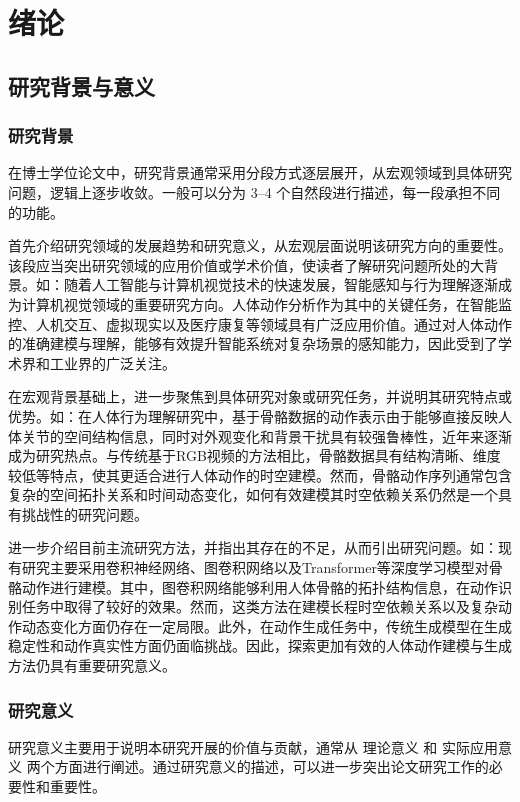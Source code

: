 
\chapter{绪论}
\section{研究背景与意义}
\subsection{研究背景}

在博士学位论文中，研究背景通常采用分段方式逐层展开，从宏观领域到具体研究问题，逻辑上逐步收敛。一般可以分为 3–4 个自然段进行描述，每一段承担不同的功能。

首先介绍研究领域的发展趋势和研究意义，从宏观层面说明该研究方向的重要性。该段应当突出研究领域的应用价值或学术价值，使读者了解研究问题所处的大背景。如：随着人工智能与计算机视觉技术的快速发展，智能感知与行为理解逐渐成为计算机视觉领域的重要研究方向。人体动作分析作为其中的关键任务，在智能监控、人机交互、虚拟现实以及医疗康复等领域具有广泛应用价值。通过对人体动作的准确建模与理解，能够有效提升智能系统对复杂场景的感知能力，因此受到了学术界和工业界的广泛关注。

在宏观背景基础上，进一步聚焦到具体研究对象或研究任务，并说明其研究特点或优势。如：在人体行为理解研究中，基于骨骼数据的动作表示由于能够直接反映人体关节的空间结构信息，同时对外观变化和背景干扰具有较强鲁棒性，近年来逐渐成为研究热点。与传统基于RGB视频的方法相比，骨骼数据具有结构清晰、维度较低等特点，使其更适合进行人体动作的时空建模。然而，骨骼动作序列通常包含复杂的空间拓扑关系和时间动态变化，如何有效建模其时空依赖关系仍然是一个具有挑战性的研究问题。

进一步介绍目前主流研究方法，并指出其存在的不足，从而引出研究问题。如：现有研究主要采用卷积神经网络、图卷积网络以及Transformer等深度学习模型对骨骼动作进行建模。其中，图卷积网络能够利用人体骨骼的拓扑结构信息，在动作识别任务中取得了较好的效果。然而，这类方法在建模长程时空依赖关系以及复杂动作动态变化方面仍存在一定局限。此外，在动作生成任务中，传统生成模型在生成稳定性和动作真实性方面仍面临挑战。因此，探索更加有效的人体动作建模与生成方法仍具有重要研究意义。

\subsection{研究意义}

研究意义主要用于说明本研究开展的价值与贡献，通常从 理论意义 和 实际应用意义 两个方面进行阐述。通过研究意义的描述，可以进一步突出论文研究工作的必要性和重要性。

